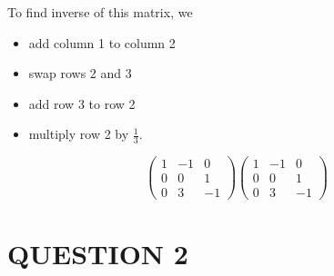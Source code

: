 \documentclass[a4paper]{article}
\begin{document}
To find inverse of this matrix, we

\begin{itemize}
	\item add column 1 to column 2
	\item swap rows 2 and 3
	\item add row 3 to row 2
	\item multiply row 2 by $ \frac{1}{3} $.
\end{itemize}

\[ \begin{pmatrix}
1 & -1 & 0\\
0 & 0 & 1 \\
0 & 3 & -1
\end{pmatrix}
\begin{pmatrix}
1 & -1 & 0\\
0 & 0 & 1 \\
0 & 3 & -1
\end{pmatrix}
\]


\section{QUESTION 2}
\end{document}
